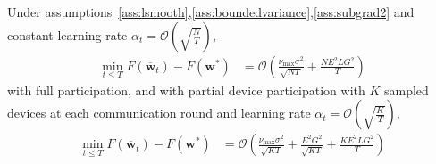 
\begin{thm}
	Under assumptions~\ref{ass:lsmooth},\ref{ass:boundedvariance},\ref{ass:subgrad2} and constant learning
	rate $\alpha_{t}=\mathcal{O}(\sqrt{\frac{N}{T}})$, 
	\begin{align*}
	\min_{t\leq T}F(\overline{\mathbf{w}}_{t})-F(\mathbf{w}^{\ast}) & =\mathcal{O}\left(\frac{\nu_{\max}\sigma^{2}}{\sqrt{NT}}+\frac{NE^{2}LG^{2}}{T}\right)
	\end{align*}
	with full participation, and with partial device participation with $K$ sampled devices at
	each communication round and learning rate $\alpha_{t}=\mathcal{O}(\sqrt{\frac{K}{T}})$,
	\begin{align*}
	\min_{t\leq T}F(\overline{\mathbf{w}}_{t})-F(\mathbf{w}^{\ast}) & =\mathcal{O}\left(\frac{\nu_{\max}\sigma^{2}}{\sqrt{KT}}+\frac{E^{2}G^{2}}{\sqrt{KT}}+\frac{KE^{2}LG^{2}}{T}\right)
	\end{align*}
\end{thm}

